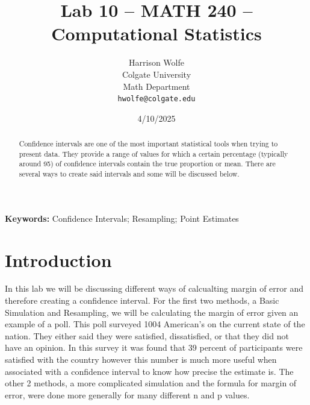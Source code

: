 \documentclass{article}\usepackage[]{graphicx}\usepackage[]{xcolor}
\begin{document}
\vspace{-1in}
\title{Lab 10 -- MATH 240 -- Computational Statistics}

\author{
  Harrison Wolfe \\
  Colgate University  \\
  Math Department  \\
  {\tt hwolfe@colgate.edu}
}

\date{4/10/2025}

\maketitle

\begin{multicols}{2}\raggedcolumns
\begin{abstract}
Confidence intervals are one of the most important statistical tools when trying to present data. They provide a range of values for which a certain percentage (typically around 95) of confidence intervals contain the true proportion or mean. There are several ways to create said intervals and some will be discussed below. 
\end{abstract}

\noindent \textbf{Keywords:} Confidence Intervals; Resampling; Point Estimates

\section{Introduction}
In this lab we will be discussing different ways of calcualting margin of error and therefore creating a confidence interval. For the first two methods, a Basic Simulation and Resampling, we will be calculating the margin of error given an example of a poll. This poll surveyed 1004 American's on the current state of the nation. They either said they were satisfied, dissatisfied, or that they did not have an opinion. In this survey it was found that 39 percent of participants were satisfied with the country however this number is much more useful when associated with a confidence interval to know how precise the estimate is. The other 2 methods, a more complicated simulation and the formula for margin of error, were done more generally for many different n and p values. 




\end{multicols}
\end{document}
